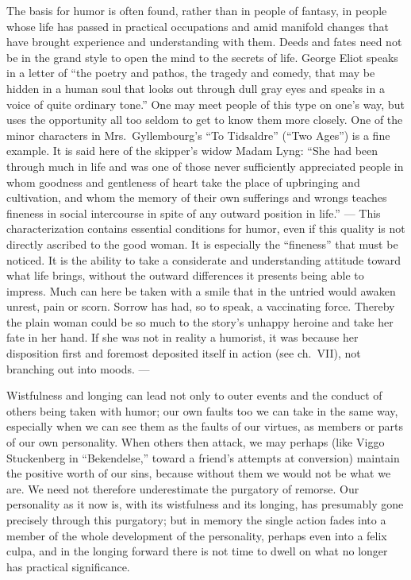 \documentclass[12pt]{book}
\newcommand{\opage}[1]{\marginnote{\footnotesize\textit{[#1]}}}
\begin{document}
The basis for humor is often found, rather than in people of fantasy, in people whose
life has passed in practical occupations and amid manifold changes that have brought
experience and understanding with them. Deeds and fates need not be in the grand style
to open the mind to the secrets of life. George Eliot speaks in a letter of ``the
poetry and pathos, the tragedy and comedy, that may be hidden in a human \opage{83}soul
that looks out through dull gray eyes and speaks in a voice of quite ordinary tone.''
One may meet people of this type on one's way, but uses the opportunity all too seldom
to get to know them more closely. One of the minor characters in Mrs.\ Gyllembourg's
``To Tidsaldre'' (``Two Ages'') is a fine example. It is said here of the skipper's
widow Madam Lyng: ``She had been through much in life and was one of those never
sufficiently appreciated people in whom goodness and gentleness of heart take the place
of upbringing and cultivation, and whom the memory of their own sufferings and wrongs
teaches fineness in social intercourse in spite of any outward position in life.'' ---
This characterization contains essential conditions for humor, even if this quality is
not directly ascribed to the good woman. It is especially the ``fineness'' that must be
noticed. It is the ability to take a considerate and understanding attitude toward what
life brings, without the outward differences it presents being able to impress. Much
can here be taken with a smile that in the untried would awaken unrest, pain or scorn.
Sorrow has had, so to speak, a vaccinating force. Thereby the plain woman could be so
much to the story's unhappy heroine and take her fate in her hand. If she was not in
reality a humorist, it was because her disposition first and foremost deposited itself
in action (see ch.~VII), not branching out into moods. ---

Wistfulness and longing can lead not only to outer events and the conduct of others
being taken with humor; our own faults too we can take in the same way, especially when
we can see them as the faults of our virtues, as members or parts of our own
personality. When others then attack, we may perhaps (like Viggo Stuckenberg in
``Bekendelse,'' toward a friend's attempts at conversion) maintain the positive worth
of our sins, because without them we would not be what we are. We need not therefore
underestimate the purgatory of remorse. Our personality as it now is, with its
wistfulness and its longing, has presumably gone precisely through this purgatory; but
in memory the single action fades into a member of the whole development of the
personality, perhaps even into a felix culpa, and in the longing forward there is not
\opage{84}time to dwell on what no longer has practical significance.
\end{document}
